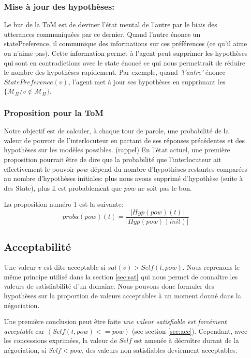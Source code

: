 \documentclass{llncs}
\begin{document}
	\subsubsection{Mise à jour des hypothèses:}
		Le but de la ToM est de deviner l'état mental de l'autre par le biais des utterances communiquées par ce dernier. Quand l'autre énonce un statePreference, il communique des informations sur ces préférences (ce qu'il aime ou n'aime pas). Cette information permet à  l'agent peut supprimer les hypothèses qui sont en contradictions avec le state énoncé ce qui nous permettrait de réduire le nombre des hypothèses rapidement.  Par exemple,  quand \emph{'l'autre'} énonce $StatePreference(v)$, l'agent met à jour ses hypothèses en supprimant les $\{\mathcal{M}_H/ v \notin \mathcal{M}_H\}$.  
	
	\subsubsection{Proposition pour la ToM}
	Notre objectif est de calculer, à chaque tour de parole, une probabilité de la valeur de pouvoir de l'interlocuteur en partant de ses réponses précédentes et des hypothèses sur les modèles possibles. (rappel)
	En l'état actuel, une première proposition pourrait être de dire que la probabilité que l'interlocuteur ait effectivement le pouvoir $pow$ dépend du nombre d'hypothèses restantes comparées au nombre d'hypothèses initiales: plus nous avons supprimé d'hypothèse (suite à des State), plus il est probablement que $pow$ ne soit pas le bon.
	
	La proposition numéro 1 est la suivante:
	$$proba(pow)(t) = \frac{|Hyp(pow)(t)|}{|Hyp(pow)(init)|}$$
	
	\subsection{Acceptabilité}
	
	Une valeur $v$ est dite acceptable si $sat(v) > Self(t, pow)$. Nous reprenons le même principe utilisé dans la section \ref{sec:sat} qui nous permet de connaître les valeurs de satisfiabilité d'un domaine. Nous pouvons donc formuler des hypothèses sur la proportion de valeurs acceptables à un moment donné dans la négociation.
	
	 Une première conclusion peut être faite \emph{une valeur \textit{satisfiable} est forcément \textit{acceptable}} car $(Self(t,pow) <= pow)$ (see section \ref{sec:acc}). Cependant, avec les concessions exprimées, la valeur de $Self$ est amenée à décroître durant de la négociation, si $Self<pow$, des valeurs non satisfiables deviennent acceptables. 
\end{document}

